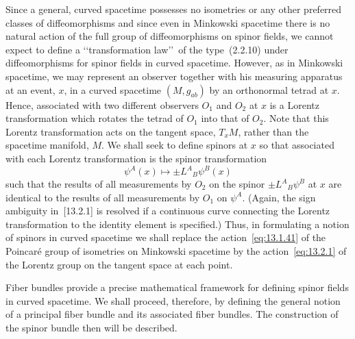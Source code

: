 Since a general, curved spacetime possesses no isometries or any other preferred
classes of diffeomorphisms and since even in Minkowski spacetime there is no natural
action of the full group of diffeomorphisms on spinor fields, we cannot expect to
define a \lq\lq transformation law\rq\rq\ of the type~(2.2.10) under
diffeomorphisms for spinor fields in curved spacetime. However, as in Minkowski
spacetime, we may represent an observer together with his measuring apparatus at an
event, \(x\), in a curved spacetime \((M,g_{ab})\) by an orthonormal tetrad at \(x\).
Hence, associated with two different observers \(O_1\) and \(O_2\) at \(x\) is a
Lorentz transformation which rotates the tetrad of \(O_1\) into that of \(O_2\).
Note that this Lorentz transformation acts on the tangent space, \(T_xM\), rather
than the spacetime manifold, \(M\). We shall seek to define spinors at \(x\) so that
associated with each Lorentz transformation is the spinor transformation
\begin{equation}
  \psi^A(x)\longmapsto\pm L^A{}_B\psi^B(x)
  \tag{13.2.1}\label{eq:13.2.1}
\end{equation}
such that the results of all measurements by \(O_2\) on the spinor
\(\pm L^A{}_B\psi^B\) at \(x\) are identical to the results of all measurements by
\(O_1\) on \(\psi^A\). (Again, the sign ambiguity in~[13.2.1] is resolved if a
continuous curve connecting the Lorentz transformation to the identity element is
specified.) Thus, in formulating a notion of spinors in curved spacetime we shall
replace the action~\eqref{eq:13.1.41} of the Poincar\'e group of isometries on
Minkowski spacetime by the action~\eqref{eq:13.2.1} of the Lorentz group on the
tangent space at each point.

Fiber bundles provide a precise mathematical framework for defining spinor fields in
curved spacetime. We shall proceed, therefore, by defining the general notion of a
principal fiber bundle and its associated fiber bundles. The construction of the
spinor bundle then will be described.

